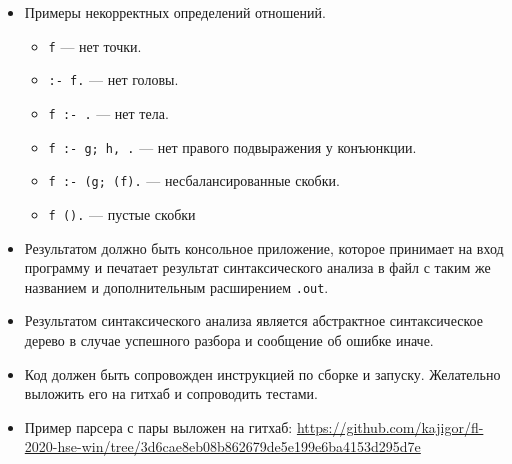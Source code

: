 \documentclass[12pt]{article}
\begin{document}
\begin{enumerate}
{\begin{itemize}
\begin{itemize}
      \end{itemize}
      \item Примеры некорректных определений отношений.
      \begin{itemize}
        \item \verb!f! --- нет точки.
        \item \verb!:- f.! --- нет головы.
        \item \verb!f :- .! --- нет тела.
        \item \verb!f :- g; h, .! --- нет правого подвыражения у конъюнкции.
        \item \verb!f :- (g; (f).! --- несбалансированные скобки.
        \item \verb!f ().! --- пустые скобки
      \end{itemize}
      \item Результатом должно быть консольное приложение, которое принимает на вход программу и печатает результат синтаксического анализа в файл с таким же названием и дополнительным расширением \verb!.out!.
      \item Результатом синтаксического анализа является абстрактное синтаксическое дерево в случае успешного разбора и сообщение об ошибке иначе.
      \item Код должен быть сопровожден инструкцией по сборке и запуску. Желательно выложить его на гитхаб и сопроводить тестами.
      \item Пример парсера с пары выложен на гитхаб: \url{https://github.com/kajigor/fl-2020-hse-win/tree/3d6cae8eb08b862679de5e199e6ba4153d295d7e}
    \end{itemize}
  }
\end{enumerate}
\end{document}
